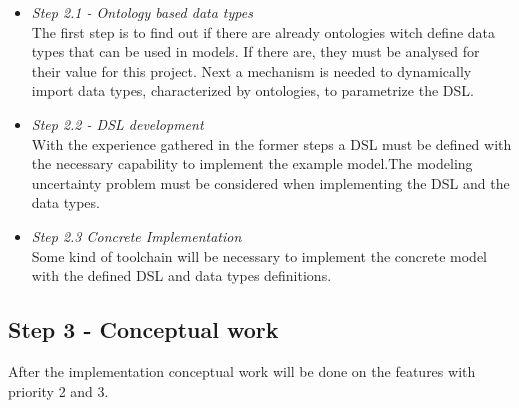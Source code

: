 \begin{itemize}
\item \emph{Step 2.1 - Ontology based data types}\\
The first step is to find out if there are already ontologies witch define data types that can be used in models. If there are, they must be analysed for their value for this project.
Next a mechanism is needed to dynamically import data types, characterized by ontologies, to parametrize the DSL.
\item \emph{Step 2.2 - DSL development}\\
With the experience gathered in the former steps a DSL must be defined with the necessary capability to implement the example model.The modeling uncertainty problem must be considered when implementing the DSL and the data types.
\item \emph{Step 2.3 Concrete Implementation}\\
Some kind of toolchain will be necessary to implement the concrete model with the defined DSL and data types definitions.
\end{itemize}

\subsection{Step 3 - Conceptual work}
After the implementation conceptual work will be done on the features with priority 2 and 3.
